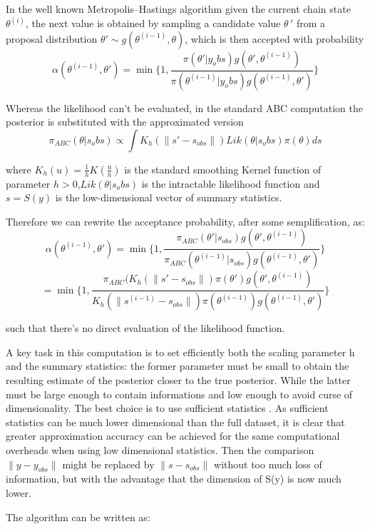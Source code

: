 \documentclass[11pt,a4paper,oneside]{report}
\begin{document}
In the well known Metropolis–Hastings algorithm given the current chain state $\theta^{(i)}$, the next value is obtained by sampling a candidate value $\theta \,'$ from a proposal distribution $\theta' \sim g(\theta^{(i-1)},\theta)$, which is then accepted with probability
 $$ \alpha(\theta^{(i-1)},\theta')= \min  \{ 1, \frac{\pi(\theta'|y_obs)g(\theta',\theta^{(i-1)})}{\pi(\theta^{(i-1)}|y_obs)g(\theta^{(i-1)},\theta') } \} $$


Whereas the likelihood can't be evaluated, in the standard ABC computation the posterior is substituted with the approximated version $$\pi_{ABC}(\theta|s_obs) \propto \int K_h(\parallel s'-s_{obs}\parallel)Lik(\theta|s_obs)\pi(\theta) ds $$

where ${K_h(u)}  =  \frac{1}{h}  K \left( \frac{u}{h} \right)$ is the standard smoothing Kernel function of parameter $ h>0$,$ Lik(\theta|s_obs)$ is the intractable likelihood function and $s=S(y)$ is the low-dimensional vector of summary statistics.

Therefore we can rewrite the acceptance probability, after some semplification, as:
 $$ \alpha(\theta^{(i-1)},\theta')= \min  \{ 1, \frac{\pi_{ABC}(\theta'|s_{obs})g(\theta',\theta^{(i-1)})}{\pi_{ABC}(\theta^{(i-1)}|s_{obs})g(\theta^{(i-1)},\theta') } \} $$
 $$ =\min  \{ 1, \frac{\pi_{ABC}(K_h(\parallel s'-s_{obs}\parallel)   \pi(\theta')g(\theta',\theta^{(i-1)})}{K_h(\parallel s^{(i-1)}-s_{obs}\parallel)   \pi(\theta^{(i-1)})g(\theta^{(i-1)},\theta') } \} $$

such that there's no direct evaluation of the likelihood function.

A key task in this computation is to set efficiently both the scaling parameter h and the summary statistics:
the former parameter must be small to obtain the resulting estimate of the posterior closer to the true posterior. While the latter must be large enough to contain informations and low enough to avoid curse of dimensionality.
The best choice is to use sufficient statistics \cite{prangle2015summary}. As sufficient statistics can be much lower dimensional than the full dataset, it is clear that greater approximation accuracy can be achieved for the same computational overheads when using low dimensional statistics.
Then the comparison $\parallel y-y_{obs} \parallel$ might be replaced by $\parallel s-s_{obs} \parallel$ without too much loss of information, but with the advantage that the dimension of S(y) is now much lower.

The algorithm \cite{fan2018abc} can be written as:
\end{document}
